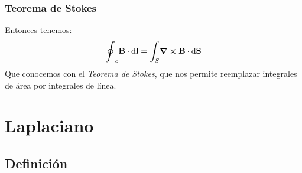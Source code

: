 \documentclass[12pt]{beamer}
\begin{document}
\begin{frame}
\frametitle{Teorema de Stokes}
Entonces tenemos:
\pause
\begin{align}
\scaleoint{6ex}_{c} \vb{B} \cdot \dd{\vb{l}} = \scaleint{6ex}_{\bs S} \curl{\vb{B}} \cdot \dd{\vb{S}}
\label{eq:ecuacion_01_35}
\end{align}
Que conocemos con el \emph{Teorema de Stokes}, que nos permite reemplazar integrales de área por integrales de línea.
\end{frame}

\section{Laplaciano}
\subsection{Definición}
\end{document}
